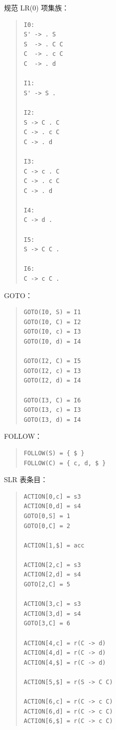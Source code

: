 \documentclass[UTF8,zihao=-4]{ctexart}
\begin{document}
规范 LR(0) 项集族：

\begin{quote}
\footnotesize
\begin{verbatim}
I0:
S' -> . S
S  -> . C C
C  -> . c C
C  -> . d

I1:
S' -> S .

I2:
S -> C . C
C -> . c C
C -> . d

I3:
C -> c . C
C -> . c C
C -> . d

I4:
C -> d .

I5:
S -> C C .

I6:
C -> c C .
\end{verbatim}
\end{quote}

GOTO：

\begin{quote}
\footnotesize
\begin{verbatim}
GOTO(I0, S) = I1
GOTO(I0, C) = I2
GOTO(I0, c) = I3
GOTO(I0, d) = I4

GOTO(I2, C) = I5
GOTO(I2, c) = I3
GOTO(I2, d) = I4

GOTO(I3, C) = I6
GOTO(I3, c) = I3
GOTO(I3, d) = I4
\end{verbatim}
\end{quote}

FOLLOW：

\begin{quote}
\footnotesize
\begin{verbatim}
FOLLOW(S) = { $ }
FOLLOW(C) = { c, d, $ }
\end{verbatim}
\end{quote}

SLR 表条目：

\begin{quote}
\footnotesize
\begin{verbatim}
ACTION[0,c] = s3
ACTION[0,d] = s4
GOTO[0,S] = 1
GOTO[0,C] = 2

ACTION[1,$] = acc

ACTION[2,c] = s3
ACTION[2,d] = s4
GOTO[2,C] = 5

ACTION[3,c] = s3
ACTION[3,d] = s4
GOTO[3,C] = 6

ACTION[4,c] = r(C -> d)
ACTION[4,d] = r(C -> d)
ACTION[4,$] = r(C -> d)

ACTION[5,$] = r(S -> C C)

ACTION[6,c] = r(C -> c C)
ACTION[6,d] = r(C -> c C)
ACTION[6,$] = r(C -> c C)
\end{verbatim}
\end{quote}
\end{document}
